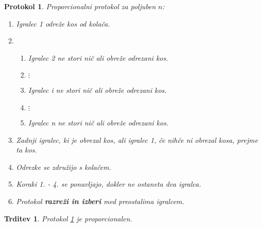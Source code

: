 \documentclass[a4paper, 12pt]{article}
\newtheorem{trditev}{Trditev}
\newtheorem{protokol}{Protokol}
\begin{document}
	\begin{protokol}
		\label{proporcionalni_n}
		Proporcionalni protokol za poljuben $n$:
		\begin{enumerate}
			
			\item Igralec 1 odreže kos od kolača.
			
			\item \begin{enumerate}
							
				\item[(1.)] Igralec 2 ne stori nič ali obreže odrezani kos.
				
				\item[] $\vdots$
				
				\item[(i.)] Igralec i ne stori nič ali obreže odrezani kos.
				
				\item[] $\vdots$
				
				\item[(n.)] Igralec n ne stori nič ali obreže odrezani kos.
				
			\end{enumerate}
		
			\item Zadnji igralec, ki je obrezal kos, ali igralec 1, če nihče ni obrezal kosa, prejme ta kos.
			
			\item Odrezke se združijo s kolačem.
			
			\item Koraki 1. - 4. se ponavljajo, dokler ne ostaneta dva igralca.
			
			\item Protokol \textbf{razreži in izberi} med preostalima igralcem.
			
		\end{enumerate}
	\end{protokol}

	\begin{trditev}
		Protokol \ref{proporcionalni_n} je proporcionalen.
	\end{trditev}
\end{document}

